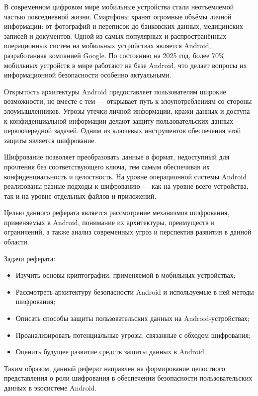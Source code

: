 
В современном цифровом мире мобильные устройства стали неотъемлемой частью
повседневной жизни. Смартфоны хранят огромные объёмы личной информации: от
фотографий и переписок до банковских данных, медицинских записей и документов.
Одной из самых популярных и распространённых операционных систем на мобильных
устройствах является Android, разработанная компанией Google. По состоянию на
2025 год, более 70\% мобильных устройств в мире работают на базе Android, что
делает вопросы их информационной безопасности особенно актуальными.

Открытость архитектуры Android предоставляет пользователям широкие возможности,
но вместе с тем — открывает путь к злоупотреблениям со стороны злоумышленников.
Угрозы утечки личной информации, кражи данных и доступа к конфиденциальной
информации делают защиту пользовательских данных первоочередной задачей. Одним
из ключевых инструментов обеспечения этой защиты является шифрование.

Шифрование позволяет преобразовать данные в формат, недоступный для прочтения
без соответствующего ключа, тем самым обеспечивая их конфиденциальность и
целостность. На уровне операционной системы Android реализованы разные подходы
к шифрованию — как на уровне всего устройства, так и на уровне отдельных файлов
и приложений.

Целью данного реферата является рассмотрение механизмов шифрования, применяемых
в Android, понимание их архитектуры, преимуществ и ограничений, а также анализ
современных угроз и перспектив развития в данной области.

Задачи реферата:

\begin{itemize}
    \item Изучить основы криптографии, применяемой в мобильных устройствах;
    \item Рассмотреть архитектуру безопасности Android и используемые в ней
        методы шифрования;
    \item Описать способы защиты пользовательских данных на Android-устройствах;
    \item Проанализировать потенциальные угрозы, связанные с обходом шифрования;
    \item Оценить будущее развитие средств защиты данных в Android.
\end{itemize}

Таким образом, данный реферат направлен на формирование целостного
представления о роли шифрования в обеспечении безопасности пользовательских
данных в экосистеме Android.
